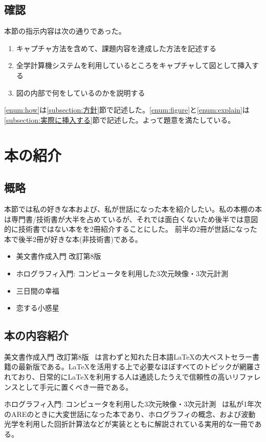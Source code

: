 \documentclass[dvipdfmx,12pt,a4j]{jarticle}
\begin{document}
\subsection{確認}
本節の指示内容は次の通りであった。
\begin{enumerate}
  \item キャプチャ方法を含めて、課題内容を達成した方法を記述する \label{enum:how}
  \item 全学計算機システムを利用しているところをキャプチャして図として挿入する\label{enum:figure}
  \item 図の内部で何をしているのかを説明する\label{enum:explain}
\end{enumerate}
\ref{enum:how}は\ref{subsection:方針}節で記述した。\ref{enum:figure}と\ref{enum:explain}は\ref{subsection:実際に挿入する}節で記述した。よって題意を満たしている。
\section{本の紹介}
\subsection{概略}
本節では私の好きな本および、私が世話になった本を紹介したい。私の本棚の本は専門書/技術書が大半を占めているが、それでは面白くないため後半では意図的に技術書ではない本をを2冊紹介することにした。
前半の2冊が世話になった本で後半2冊が好きな本(非技術書)である。
\begin{itemize}
  \item \LaTeXe 美文書作成入門 改訂第8版 ~\cite{bibunsho}
  \item ホログラフィ入門: コンピュータを利用した3次元映像・3次元計測~\cite{holo-nyumon} 
  \item 三日間の幸福~\cite{koufuku}
  \item 恋する小惑星~\cite{koiasu}
\end{itemize}

\subsection{本の内容紹介}
\LaTeXe 美文書作成入門 改訂第8版 ~\cite{bibunsho}は言わずと知れた日本語\LaTeX の大ベストセラー書籍の最新版である。\LaTeX を活用する上で必要なほぼすべてのトピックが網羅されており、日常的に\LaTeX を利用する人は通読したうえで信頼性の高いリファレンスとして手元に置くべき一冊である。

ホログラフィ入門: コンピュータを利用した3次元映像・3次元計測~\cite{holo-nyumon} は私が1年次のAREのときに大変世話になった本であり、ホログラフィの概念、および波動光学を利用した回折計算法などが実装とともに解説されている実用的な一冊である。
\end{document}
